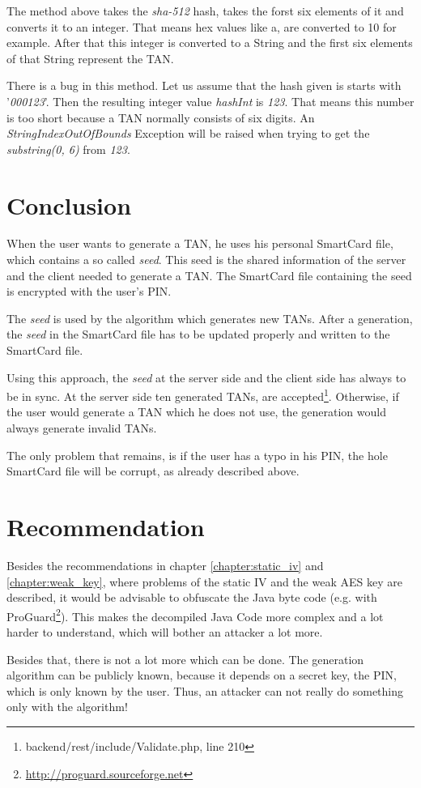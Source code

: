 The method above takes the \textit{sha-512} hash, takes the forst six elements of it and converts it to an integer. That means hex values like a, are converted to 10 for example. After that this integer is converted to a String and the first six elements of that String represent the TAN.

There is a bug in this method. Let us assume that the hash given is starts with '\textit{000123}'. Then the resulting integer value \textit{hashInt} is \textit{123}. That means this number is too short because a TAN normally consists of six digits. An \textit{StringIndexOutOfBounds} Exception will be raised when trying to get the \textit{substring(0, 6)} from \textit{123}.

\section{Conclusion}

When the user wants to generate a TAN, he uses his personal SmartCard file, which contains a so called \textit{seed}. This seed is the shared information of the server and the client needed to generate a TAN. The SmartCard file containing the seed is encrypted with the user's PIN.

The \textit{seed} is used by the algorithm which generates new TANs. After a generation, the \textit{seed} in the SmartCard file has to be updated properly and written to the SmartCard file.

Using this approach, the \textit{seed} at the server side and the client side has always to be in sync. At the server side ten generated TANs, are accepted\footnote{backend/rest/include/Validate.php, line 210}. Otherwise, if the user would generate a TAN which he does not use, the generation would always generate invalid TANs.

The only problem that remains, is if the user has a typo in his PIN, the hole SmartCard file will be corrupt, as already described above.

\section{Recommendation}

Besides the recommendations in chapter \ref{chapter:static_iv} and \ref{chapter:weak_key}, where problems of the static IV and the weak AES key are described, it would be advisable to obfuscate the Java byte code (e.g. with ProGuard\footnote{\url{http://proguard.sourceforge.net}}). This makes the decompiled Java Code more complex and a lot harder to understand, which will bother an attacker a lot more.

Besides that, there is not a lot more which can be done. The generation algorithm can be publicly known, because it depends on a secret key, the PIN, which is only known by the user. Thus, an attacker can not really do something only with the algorithm!